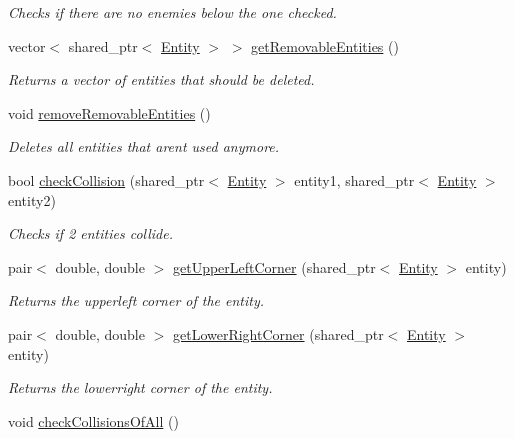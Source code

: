 \begin{DoxyCompactItemize}
\begin{DoxyCompactList}\small\item\em Checks if there are no enemies below the one checked. \end{DoxyCompactList}\item 
vector$<$ shared\+\_\+ptr$<$ \hyperlink{classGameLogic_1_1Entity}{Entity} $>$ $>$ \hyperlink{classGameLogic_1_1Level_aa6b01a37c08040974534c00031e8cbed}{get\+Removable\+Entities} ()
\begin{DoxyCompactList}\small\item\em Returns a vector of entities that should be deleted. \end{DoxyCompactList}\item 
void \hyperlink{classGameLogic_1_1Level_a6f581d8c053ae5a9d5b6a333b455038f}{remove\+Removable\+Entities} ()
\begin{DoxyCompactList}\small\item\em Deletes all entities that aren\textquotesingle{}t used anymore. \end{DoxyCompactList}\item 
bool \hyperlink{classGameLogic_1_1Level_aaf7dd085cfe83d8c59f224f8d0acc6ec}{check\+Collision} (shared\+\_\+ptr$<$ \hyperlink{classGameLogic_1_1Entity}{Entity} $>$ entity1, shared\+\_\+ptr$<$ \hyperlink{classGameLogic_1_1Entity}{Entity} $>$ entity2)
\begin{DoxyCompactList}\small\item\em Checks if 2 entities collide. \end{DoxyCompactList}\item 
pair$<$ double, double $>$ \hyperlink{classGameLogic_1_1Level_ae6edaa461fc6cd170387a3d7b3e16d1f}{get\+Upper\+Left\+Corner} (shared\+\_\+ptr$<$ \hyperlink{classGameLogic_1_1Entity}{Entity} $>$ entity)
\begin{DoxyCompactList}\small\item\em Returns the upperleft corner of the entity. \end{DoxyCompactList}\item 
pair$<$ double, double $>$ \hyperlink{classGameLogic_1_1Level_a0a4b3dacec30ac1de1a2170082a9d799}{get\+Lower\+Right\+Corner} (shared\+\_\+ptr$<$ \hyperlink{classGameLogic_1_1Entity}{Entity} $>$ entity)
\begin{DoxyCompactList}\small\item\em Returns the lowerright corner of the entity. \end{DoxyCompactList}\item 
void \hyperlink{classGameLogic_1_1Level_a9792c2e1bbb52931fe83355fcbb35b89}{check\+Collisions\+Of\+All} ()

\end{DoxyCompactItemize}
